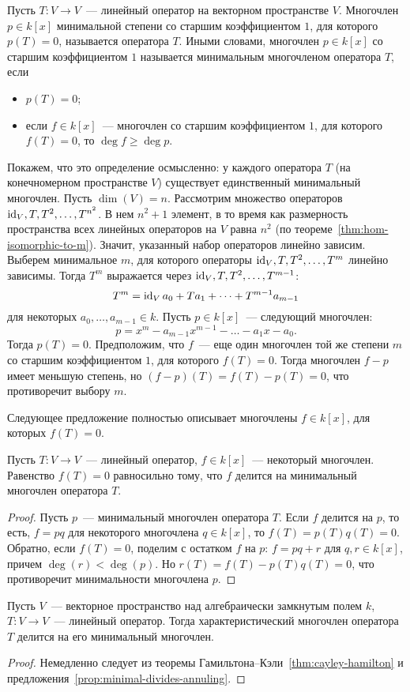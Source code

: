 \begin{definition}\label{dfn:minimal-polynomial}
Пусть $T\colon V\to V$~--- линейный оператор на векторном пространстве $V$.
Многочлен $p\in k[x]$ минимальной степени со старшим коэффициентом $1$,
для которого $p(T)=0$, называется  оператора $T$.
Иными словами, многочлен $p\in k[x]$ со старшим коэффициентом $1$ называется
минимальным многочленом оператора $T$, если
\begin{itemize}
\item $p(T)=0$;
\item если $f\in k[x]$~--- многочлен со старшим коэффициентом $1$, для
которого $f(T)=0$, то $\deg f\geq \deg p$.
\end{itemize}
\end{definition}

Покажем, что это определение осмысленно: у каждого оператора $T$
(на конечномерном пространстве $V$) существует единственный
минимальный многочлен. Пусть $\dim(V)=n$.
Рассмотрим множество операторов $\operatorname{id}_V,T,T^2,\dots,T^{n^2}$. В нем
$n^2+1$ элемент, в то время как размерность пространства всех
линейных операторов на $V$ равна $n^2$
(по теореме~\ref{thm:hom-isomorphic-to-m}). Значит, указанный набор
операторов линейно зависим. Выберем минимальное $m$, для которого
операторы $\operatorname{id}_V,T,T^2,\dots,T^m$ линейно зависимы. Тогда
$T^m$ выражается через $\operatorname{id}_V,T,T^2,\dots,T^{m-1}$:
$$
T^m = \operatorname{id}_V a_0 + Ta_1 + \dots + T^{m-1}a_{m-1}
$$
для некоторых $a_0,\dots,a_{m-1}\in k$.
Пусть $p\in k[x]$~--- следующий многочлен:
$$
p = x^m - a_{m-1}x^{m-1} - \dots - a_1x - a_0.
$$
Тогда $p(T)=0$. Предположим, что $f$~--- еще один многочлен той же степени
$m$ со старшим коэффициентом $1$, для которого $f(T)=0$.
Тогда многочлен $f-p$ имеет меньшую степень, но
$(f-p)(T) = f(T) - p(T) = 0$, что противоречит выбору $m$.

Следующее предложение полностью описывает многочлены $f\in k[x]$, для которых
$f(T) = 0$.
\begin{proposition}\label{prop:minimal-divides-annuling}
Пусть $T\colon V\to V$~--- линейный оператор, $f\in k[x]$~--- некоторый
многочлен.
Равенство $f(T)=0$ равносильно тому, что $f$ делится на минимальный
многочлен оператора $T$.
\end{proposition}
\begin{proof}
Пусть $p$~--- минимальный многочлен оператора $T$. Если $f$ делится на $p$,
то есть, $f=pq$ для некоторого многочлена $q\in k[x]$,
то $f(T) = p(T)q(T) = 0$.
Обратно, если $f(T)=0$, поделим с остатком $f$ на $p$:
$f = pq+r$ для $q,r\in k[x]$, причем $\deg(r) < \deg(p)$.
Но $r(T) = f(T)-p(T)q(T) = 0$, что противоречит минимальности
многочлена $p$.
\end{proof}
\begin{corollary}
Пусть $V$~--- векторное пространство над алгебраически замкнутым полем $k$,
$T\colon V\to V$~--- линейный оператор.
Тогда характеристический многочлен оператора $T$ делится на его
минимальный многочлен.
\end{corollary}
\begin{proof}
Немедленно следует из теоремы Гамильтона--Кэли~\ref{thm:cayley-hamilton}
и предложения~\ref{prop:minimal-divides-annuling}.
\end{proof}

